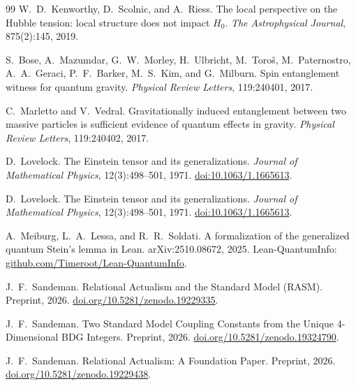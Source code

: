\documentclass[11pt,a4paper]{article}
\theoremstyle{plain}
\theoremstyle{definition}
\theoremstyle{remark}
\begin{document}
\begin{thebibliography}{99}
W.~D.~Kenworthy, D.~Scolnic, and A.~Riess.
\newblock The local perspective on the {Hubble} tension: local structure does
  not impact $H_0$.
\newblock \textit{The Astrophysical Journal}, 875(2):145, 2019.

S.~Bose, A.~Mazumdar, G.~W.~Morley, H.~Ulbricht, M.~Toro\v{s},
  M.~Paternostro, A.~A.~Geraci, P.~F.~Barker, M.~S.~Kim, and G.~Milburn.
\newblock Spin entanglement witness for quantum gravity.
\newblock \textit{Physical Review Letters}, 119:240401, 2017.

C.~Marletto and V.~Vedral.
\newblock Gravitationally induced entanglement between two massive particles is
  sufficient evidence of quantum effects in gravity.
\newblock \textit{Physical Review Letters}, 119:240402, 2017.

D.~Lovelock.
\newblock The Einstein tensor and its generalizations.
\newblock \emph{Journal of Mathematical Physics}, 12(3):498--501, 1971.
\newblock \href{https://doi.org/10.1063/1.1665613}{doi:10.1063/1.1665613}.

D.~Lovelock.
\newblock The Einstein tensor and its generalizations.
\newblock \emph{Journal of Mathematical Physics}, 12(3):498--501, 1971.
\newblock \href{https://doi.org/10.1063/1.1665613}{doi:10.1063/1.1665613}.

A.~Meiburg, L.~A.~Lessa, and R.~R.~Soldati.
\newblock A formalization of the generalized quantum {Stein's} lemma in {Lean}.
\newblock arXiv:2510.08672, 2025.
\newblock Lean-QuantumInfo:
  \href{https://github.com/Timeroot/Lean-QuantumInfo}{github.com/Timeroot/Lean-QuantumInfo}.

J.~F.~Sandeman.
\newblock Relational Actualism and the Standard Model ({RASM}).
\newblock Preprint, 2026.
\newblock \href{https://doi.org/10.5281/zenodo.19229335}{doi.org/10.5281/zenodo.19229335}.

J.~F.~Sandeman.
\newblock Two Standard Model Coupling Constants from the Unique 4-Dimensional
  BDG Integers.
\newblock Preprint, 2026.
\newblock \href{https://doi.org/10.5281/zenodo.19324790}{doi.org/10.5281/zenodo.19324790}.

J.~F.~Sandeman.
\newblock Relational Actualism: A Foundation Paper.
\newblock Preprint, 2026.
\newblock \href{https://doi.org/10.5281/zenodo.19229438}{doi.org/10.5281/zenodo.19229438}.


\end{thebibliography}
\end{document}
